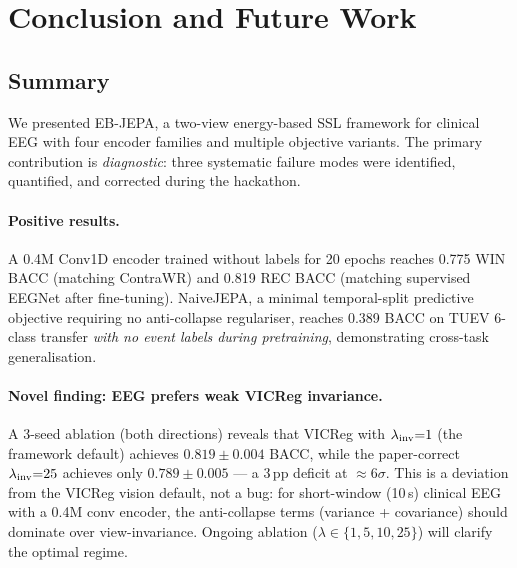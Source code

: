 \documentclass[11pt,a4paper]{article}
\begin{document}
\section{Conclusion and Future Work}
\label{sec:conclusion}

\subsection{Summary}

We presented EB-JEPA, a two-view energy-based SSL framework for clinical EEG with four
encoder families and multiple objective variants.
The primary contribution is \emph{diagnostic}: three systematic failure modes were
identified, quantified, and corrected during the hackathon.

\paragraph{Positive results.}
A 0.4M Conv1D encoder trained without labels for 20 epochs reaches 0.775 WIN BACC
(matching ContraWR) and 0.819 REC BACC (matching supervised EEGNet after fine-tuning).
NaiveJEPA, a minimal temporal-split predictive objective requiring no anti-collapse
regulariser, reaches 0.389 BACC on TUEV 6-class transfer \emph{with no event labels
during pretraining}, demonstrating cross-task generalisation.

\paragraph{Novel finding: EEG prefers weak VICReg invariance.}
A 3-seed ablation (both directions) reveals that VICReg with $\lambda_{\rm inv}{=}1$
(the framework default) achieves $0.819 \pm 0.004$ BACC, while the paper-correct
$\lambda_{\rm inv}{=}25$ achieves only $0.789 \pm 0.005$ --- a $3\,\text{pp}$
deficit at ${\approx}6\sigma$.  This is a deviation from the VICReg vision default,
not a bug: for short-window (10\,s) clinical EEG with a 0.4M conv encoder, the
anti-collapse terms (variance + covariance) should dominate over view-invariance.
Ongoing ablation ($\lambda \in \{1, 5, 10, 25\}$) will clarify the optimal regime.
\end{document}
